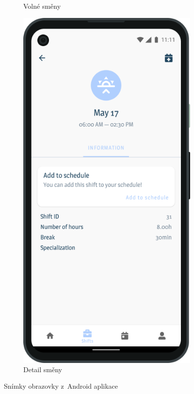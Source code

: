 \documentclass[a4paper,11pt,openany,twoside]{book}
\begin{document}
\begin{figure}
\begin{subfigure}{0.34\textwidth}
         \caption{Volné směny}
         \label{sub:android3}
     \end{subfigure}
		 \hspace{1em}
	\begin{subfigure}{0.34\textwidth}
				\centering
         \includegraphics[width=\textwidth]{img/shift-detail.png}
         \caption{Detail směny}
         \label{sub:android4}
     \end{subfigure}
	\caption{Snímky obrazovky z~Android aplikace}
	\label{fig:screenshots}
\end{figure}
\end{document}
